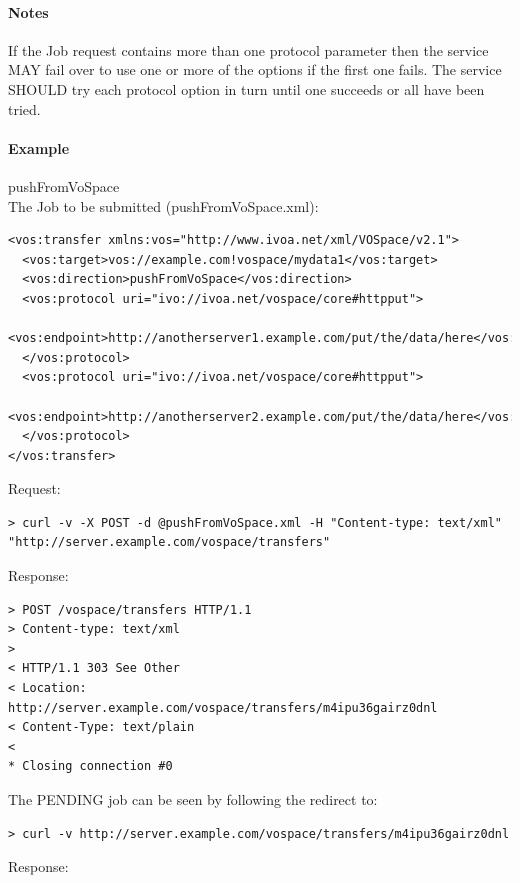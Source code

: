 \documentclass[11pt,a4paper]{ivoa}
\begin{document}
\paragraph{Notes}
If the Job request contains more than one protocol parameter then the service MAY fail over to use one or more of the options if the first one fails. The service SHOULD try each protocol option in turn until one succeeds or all have been tried.

\paragraph{Example}
pushFromVoSpace
\\[5px]
\noindent
The Job to be submitted (pushFromVoSpace.xml):
\begin{lstlisting}
<vos:transfer xmlns:vos="http://www.ivoa.net/xml/VOSpace/v2.1">
  <vos:target>vos://example.com!vospace/mydata1</vos:target>
  <vos:direction>pushFromVoSpace</vos:direction>
  <vos:protocol uri="ivo://ivoa.net/vospace/core#httpput">
    <vos:endpoint>http://anotherserver1.example.com/put/the/data/here</vos:endpoint>
  </vos:protocol>
  <vos:protocol uri="ivo://ivoa.net/vospace/core#httpput">
    <vos:endpoint>http://anotherserver2.example.com/put/the/data/here</vos:endpoint>
  </vos:protocol>
</vos:transfer>
\end{lstlisting}
Request:
\begin{lstlisting}
> curl -v -X POST -d @pushFromVoSpace.xml -H "Content-type: text/xml" "http://server.example.com/vospace/transfers"
\end{lstlisting}
Response:
\begin{lstlisting}
> POST /vospace/transfers HTTP/1.1
> Content-type: text/xml
>
< HTTP/1.1 303 See Other
< Location: http://server.example.com/vospace/transfers/m4ipu36gairz0dnl
< Content-Type: text/plain
<
* Closing connection #0
\end{lstlisting}
The PENDING job can be seen by following the redirect to:
\begin{lstlisting}
> curl -v http://server.example.com/vospace/transfers/m4ipu36gairz0dnl
\end{lstlisting}
Response:
\end{document}
